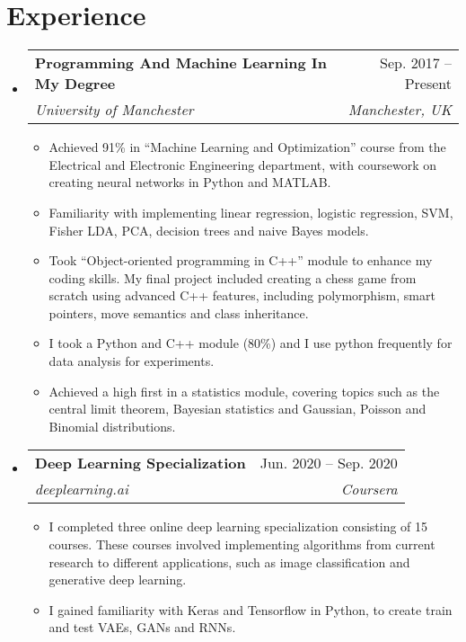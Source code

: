 \documentclass[letterpaper,11pt]{article}
\makeatletter
\newcommand{\resumeItem}[1]{
  \item\small{
    {#1 \vspace{-2pt}}
  }
}
\newcommand{\resumeSubheading}[4]{
  \vspace{-2pt}\item
    \begin{tabular*}{0.97\textwidth}[t]{l@{\extracolsep{\fill}}r}
      \textbf{#1} & #2 \\
      \textit{\small#3} & \textit{\small #4} \\
    \end{tabular*}\vspace{-7pt}
}
\newcommand{\resumeSubSubheading}[2]{
    \item
    \begin{tabular*}{0.97\textwidth}{l@{\extracolsep{\fill}}r}
      \textit{\small#1} & \textit{\small #2} \\
    \end{tabular*}\vspace{-7pt}
}
\newcommand{\resumeSubHeadingListStart}{\begin{itemize}[leftmargin=0.15in, label={}]}
\newcommand{\resumeSubHeadingListEnd}{\end{itemize}}
\newcommand{\resumeItemListStart}{\begin{itemize}}
\newcommand{\resumeItemListEnd}{\end{itemize}\vspace{-5pt}}
\makeatother
\begin{document}
\section{Experience}
  \resumeSubHeadingListStart

    \resumeSubheading
      {Programming And Machine Learning In My Degree}{Sep. 2017 -- Present}
      {University of Manchester}{Manchester, UK}
      \resumeItemListStart
        \resumeItem{Achieved 91\% in “Machine Learning and Optimization” course from the Electrical and Electronic Engineering department, with coursework on creating neural networks in Python and MATLAB.}
        \resumeItem{Familiarity with implementing linear regression, logistic regression, SVM, Fisher LDA, PCA, decision trees and naive Bayes models.}
        \resumeItem{Took “Object-oriented programming in C++” module to enhance my coding skills. My final project included creating a chess game from scratch using advanced C++ features, including polymorphism, smart pointers, move semantics and class inheritance.}
        \resumeItem{I took a Python and C++ module (80\%) and I use python frequently for data analysis for experiments.}
        \resumeItem{Achieved a high first in a statistics module, covering topics such as the central limit theorem, Bayesian statistics and Gaussian, Poisson and Binomial distributions.}
      \resumeItemListEnd
      

    \resumeSubheading
      {Deep Learning Specialization}{Jun. 2020 -- Sep. 2020}
      {deeplearning.ai}{Coursera}
      \resumeItemListStart
        \resumeItem{I completed three online deep learning specialization consisting of 15 courses. These courses involved implementing algorithms from current research to different applications, such as image classification and generative deep learning.}
        \resumeItem{I gained familiarity with Keras and Tensorflow in Python, to create train and test VAEs, GANs and RNNs. }
    \resumeItemListEnd

  \resumeSubHeadingListEnd


\end{document}
